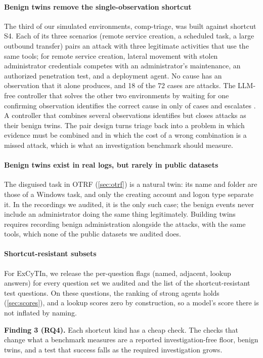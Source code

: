 \paragraph{Benign twins remove the single-observation shortcut} The third of our simulated environments, comp-triage, was built against shortcut S4. Each of its three scenarios (remote service creation, a scheduled task, a large outbound transfer) pairs an attack with three legitimate activities that use the same tools; for remote service creation, lateral movement with stolen administrator credentials competes with an administrator's maintenance, an authorized penetration test, and a deployment agent. No cause has an observation that it alone produces, and 18 of the 72 cases are attacks. The LLM-free controller that solves the other two environments by waiting for one confirming observation identifies the correct cause in only \compSingle{} of \compN{} cases and escalates \compSingleEsc. A controller that combines several observations identifies \compJoint{} but closes \compJointMissed{} attacks as their benign twins. The pair design turns triage back into a problem in which evidence must be combined and in which the cost of a wrong combination is a missed attack, which is what an investigation benchmark should measure.

\paragraph{Benign twins exist in real logs, but rarely in public datasets} The disguised task in OTRF (\cref{sec:otrf}) is a natural twin: its name and folder are those of a Windows task, and only the creating account and logon type separate it. In the recordings we audited, it is the only such case; the benign events never include an administrator doing the same thing legitimately. Building twins requires recording benign administration alongside the attacks, with the same tools, which none of the public datasets we audited does.

\paragraph{Shortcut-resistant subsets} For ExCyTIn, we release the per-question flags (named, adjacent, lookup answers) for every question set we audited and the list of the \lgResN{} shortcut-resistant test questions. On these questions, the ranking of strong agents holds (\cref{sec:scores}), and a lookup scores zero by construction, so a model's score there is not inflated by naming.

\smallskip\noindent\textbf{Finding 3 (RQ4).} Each shortcut kind has a cheap check. The checks that change what a benchmark measures are a reported investigation-free floor, benign twins, and a test that success falls as the required investigation grows.
